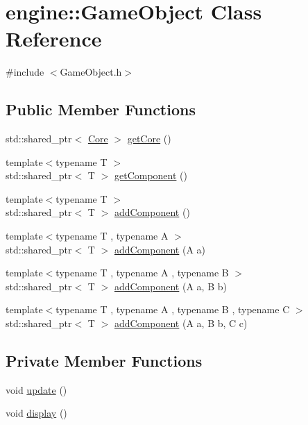 \hypertarget{classengine_1_1_game_object}{}\section{engine\+:\+:Game\+Object Class Reference}
\label{classengine_1_1_game_object}


{\ttfamily \#include $<$Game\+Object.\+h$>$}

\subsection*{Public Member Functions}
\begin{DoxyCompactItemize}
\item 
std\+::shared\+\_\+ptr$<$ \mbox{\hyperlink{classengine_1_1_core}{Core}} $>$ \mbox{\hyperlink{classengine_1_1_game_object_a228449afa903d63458376b5af46b477d}{get\+Core}} ()
\item 
{\footnotesize template$<$typename T $>$ }\\std\+::shared\+\_\+ptr$<$ T $>$ \mbox{\hyperlink{classengine_1_1_game_object_addd3fdd6fe482e20fb0dff73beaf37aa}{get\+Component}} ()
\item 
{\footnotesize template$<$typename T $>$ }\\std\+::shared\+\_\+ptr$<$ T $>$ \mbox{\hyperlink{classengine_1_1_game_object_ace1c57763236e72b58bf5b0da63b196d}{add\+Component}} ()
\item 
{\footnotesize template$<$typename T , typename A $>$ }\\std\+::shared\+\_\+ptr$<$ T $>$ \mbox{\hyperlink{classengine_1_1_game_object_a625ab49a4c0f2d354c6d79796febe6ed}{add\+Component}} (A a)
\item 
{\footnotesize template$<$typename T , typename A , typename B $>$ }\\std\+::shared\+\_\+ptr$<$ T $>$ \mbox{\hyperlink{classengine_1_1_game_object_a49fad8d248f540dd600295ba29a44cc0}{add\+Component}} (A a, B b)
\item 
{\footnotesize template$<$typename T , typename A , typename B , typename C $>$ }\\std\+::shared\+\_\+ptr$<$ T $>$ \mbox{\hyperlink{classengine_1_1_game_object_add2ff6419d40173c98721e464ae6e54d}{add\+Component}} (A a, B b, C c)
\end{DoxyCompactItemize}
\subsection*{Private Member Functions}
\begin{DoxyCompactItemize}
\item 
void \mbox{\hyperlink{classengine_1_1_game_object_aaf47f528862a2d631ee6969ba18e317e}{update}} ()
\item 
void \mbox{\hyperlink{classengine_1_1_game_object_a97bc684bf74b1619e1071e939a9c3c48}{display}} ()
\end{DoxyCompactItemize}
